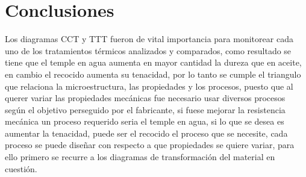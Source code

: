 \documentclass[a4paper, 9pt]{article}
\begin{document}
\section{Conclusiones}
Los diagramas CCT y TTT fueron de vital importancia para monitorear cada uno de los tratamientos térmicos analizados y comparados, como resultado se tiene que el temple en agua aumenta en mayor cantidad la dureza que en aceite, en cambio el recocido aumenta su tenacidad, por lo tanto se cumple el triangulo que relaciona la microestructura, las propiedades y los procesos, puesto que al querer variar las propiedades mecánicas fue necesario usar diversos procesos según el objetivo perseguido por el fabricante, si fuese mejorar la resistencia mecánica un proceso requerido seria el temple en agua, si lo que se desea es aumentar la tenacidad, puede ser el recocido el proceso que se necesite, cada proceso se puede diseñar con respecto a que propiedades se quiere variar, para ello primero se recurre a los diagramas de transformación del material en cuestión.
\end{document}
